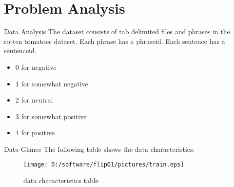\documentclass[
 size=12pt,
 paper=smartboard, %
 mode=present, %
 display=slides, %
style=tuliplab,
pauseslide,
fleqn,leqno]{powerdot}
\begin{document}
    \section{Problem Analysis}
  
\begin{slide}{Data Analysis}
  \hspace{0.5cm}  The dataset consists of tab delimited files and phrases in the rotten tomatoes dataset. Each phrase has a phraseid. Each sentence has a sentenceid.\\
  
  \vspace{1cm}
\begin{itemize}
  \item 0 for negative
  \item 1 for somewhat negative
  \item 2 for neutral
  \item 3 for somewhat positive
  \item 4 for positive
\end{itemize}

\end{slide}  
\begin{slide}{Data Glance}
  \hspace{0.5cm}  The following table shows the data characteristics.\\
  
  \vspace{1cm}
  \begin{figure}[ht]%
    \centering%
    \texttt{[image: D:/software/flip01/pictures/train.eps]}
    \caption{data characteristics table}%
    \end{figure}
\end{slide}
\end{document}
